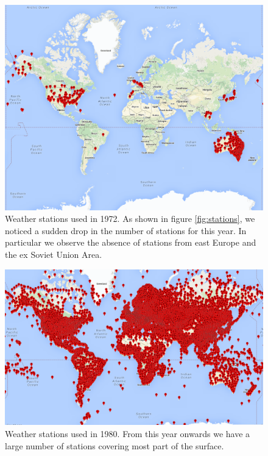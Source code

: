\documentclass{vldb}
\begin{document}
\begin{figure}[tbh]
\includegraphics[width=1\linewidth]{stations1972}
\caption{Weather stations used in 1972. As shown in figure \ref{fig:stations}, we noticed a sudden drop in the number of stations for this year. In particular we observe the absence of stations from east Europe and the ex Soviet Union Area.}
\label{fig:stations1972}
\end{figure}

\begin{figure}[tbh]
\includegraphics[width=1\linewidth]{stations1980}
\caption{Weather stations used in 1980. From this year onwards we have a large number of stations covering most part of the surface.}
\label{fig:stations1980}
\end{figure}
\end{document}
